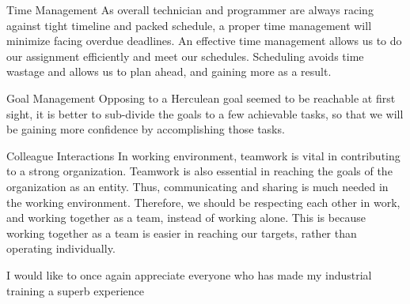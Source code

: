 \documentclass[12pt,a4paper]{report}
\begin{document}
Time Management
As overall technician and programmer are always racing against tight timeline and packed schedule, a proper time management will minimize facing overdue deadlines. An effective time management allows us to do our assignment efficiently and meet our schedules. Scheduling avoids time wastage and allows us to plan ahead, and gaining more as a result. 

Goal Management
Opposing to a Herculean goal seemed to be reachable at first sight, it is better to sub-divide the goals to a few achievable tasks, so that we will be gaining more confidence by accomplishing those tasks. 

Colleague Interactions
In working environment, teamwork is vital in contributing to a strong organization. Teamwork is also essential in reaching the goals of the organization as an entity. Thus, communicating and sharing is much needed in the working environment. Therefore, we should be respecting each other in work, and working together as a team, instead of working alone. This is because working together as a team is easier in reaching our targets, rather than operating individually. 

I would like to once again appreciate everyone who has made my industrial training a superb experience
\end{document}
